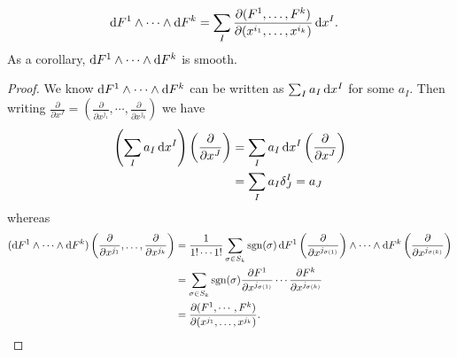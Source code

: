 \begin{enumerate}
{    \begin{lemma}
      \begin{align*}
         \mathop{}\!\mathrm{d} F^1 \wedge \cdots \wedge \mathop{}\!\mathrm{d} F^k
      &= \sum_I
           \frac{\partial (F^1, \dots, F^k)}
                {\partial (x^{i_1}, \dots, x^{i_k})}
           \mathop{}\!\mathrm{d} x^I.
      \end{align*}
      As a corollary, $\mathop{}\!\mathrm{d} F^1 \wedge \cdots \wedge \mathop{}\!\mathrm{d} F^k$ is smooth.
    \end{lemma}
    \begin{proof}
      We know $\mathop{}\!\mathrm{d} F^1 \wedge \cdots \wedge \mathop{}\!\mathrm{d} F^k$
      can be written as $\sum_I a_I \mathop{}\!\mathrm{d} x^I$ for some $a_I$. Then
      writing
      $
        \frac{\partial}{\partial x^J}
      = \left(
          \frac{\partial}{\partial x^{j_1}},
          \cdots,
          \frac{\partial}{\partial x^{j_k}}
        \right)
      $
      we have
      \begin{align*}
        \left(
          \sum_I
            a_I \mathop{}\!\mathrm{d} x^I
        \right)
          \left(
            \frac{\partial}{\partial x^J}
          \right)
      &= \sum_I
           a_I \mathop{}\!\mathrm{d} x^I
           \left(
             \frac{\partial}{\partial x^J}
           \right) \\
      &= \sum_I
           a_I \delta^I_J = a_J
      \end{align*}
      whereas
      \begin{align*}
        (\mathop{}\!\mathrm{d} F^1 \wedge \cdots \wedge \mathop{}\!\mathrm{d} F^k)
          \left(
            \frac{\partial}{\partial x^{j_1}},
            \dots,
            \frac{\partial}{\partial x^{j_k}}
          \right)
      &= \frac{1}{1! \cdots 1!}
           \sum_{\sigma \in S_k}
             \mathrm{sgn}(\sigma)
             \mathop{}\!\mathrm{d} F^1
               \left(
                 \frac{\partial}{\partial x^{j_{\sigma(1)}}}
               \right)
             \wedge \cdots \wedge
             \mathop{}\!\mathrm{d} F^k
               \left(
                 \frac{\partial}{\partial x^{j_{\sigma(k)}}}
               \right) \\
      &= \sum_{\sigma \in S_k}
           \mathrm{sgn}(\sigma)
           \frac{\partial F^1}{\partial x^{j_{\sigma(1)}}}
           \cdots
           \frac{\partial F^k}{\partial x^{j_{\sigma(k)}}} \\
      &= \frac{\partial (F^1, \cdots, F^k)}
              {\partial (x^{j_1}, \dots, x^{j_k})}.
      \end{align*}
    \end{proof}

}
\end{enumerate}
